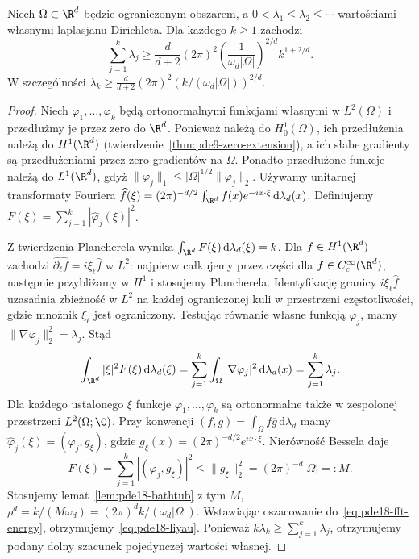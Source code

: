 \begin{twierdzenie}
\label{thm:pde18-liyau}
Niech $\Omega\subset\R^d$ będzie ograniczonym obszarem,
a $0<\lambda_1\le\lambda_2\le\cdots$ wartościami własnymi
laplasjanu Dirichleta. Dla każdego $k\ge1$ zachodzi
\begin{equation}\label{eq:pde18-liyau}
 \sum_{j=1}^k\lambda_j\ge
 \frac{d}{d+2}(2\pi)^2
 \left(\frac{1}{\omega_d|\Omega|}\right)^{2/d}
 k^{1+2/d}.
\end{equation}
W szczególności
$\lambda_k\ge\frac d{d+2}(2\pi)^2
(k/(\omega_d|\Omega|))^{2/d}$.
\end{twierdzenie}
\begin{proof}
Niech $\varphi_1,\ldots,\varphi_k$ będą ortonormalnymi
funkcjami własnymi w $L^2(\Omega)$ i przedłużmy je przez
zero do $\R^d$. Ponieważ należą do $H_0^1(\Omega)$,
ich przedłużenia należą do $H^1(\R^d)$
(twierdzenie~\ref{thm:pde9-zero-extension}), a ich słabe
gradienty są przedłużeniami przez zero gradientów na $\Omega$.
Ponadto przedłużone funkcje należą do $L^1(\R^d)$, gdyż
$\|\varphi_j\|_1\le|\Omega|^{1/2}\|\varphi_j\|_2$.
Używamy unitarnej transformaty Fouriera
$\widehat f(\xi)=(2\pi)^{-d/2}
\int_{\R^d}f(x)e^{-ix\cdot\xi}\,\mathrm d\lambda_d(x)$.
Definiujemy $F(\xi)=\sum_{j=1}^k|\widehat\varphi_j(\xi)|^2$.

Z twierdzenia Plancherela wynika
$\int_{\R^d}F(\xi)\,\mathrm d\lambda_d(\xi)=k$.
Dla $f\in H^1(\R^d)$ zachodzi
$\widehat{\partial_\ell f}=i\xi_\ell\widehat f$
w $L^2$: najpierw całkujemy przez części dla
$f\in C_c^\infty(\R^d)$, następnie przybliżamy w $H^1$
i stosujemy Plancherela. Identyfikację granicy
$i\xi_\ell\widehat f$ uzasadnia zbieżność w $L^2$
na każdej ograniczonej kuli w przestrzeni częstotliwości,
gdzie mnożnik $\xi_\ell$ jest ograniczony.
Testując równanie własne funkcją $\varphi_j$, mamy
$\|\nabla\varphi_j\|_2^2=\lambda_j$.
Stąd
\begin{equation}\label{eq:pde18-fft-energy}
 \int_{\R^d}|\xi|^2F(\xi)\,\mathrm d\lambda_d(\xi)
 =\sum_{j=1}^k\int_\Omega|\nabla\varphi_j|^2
 \,\mathrm d\lambda_d(x)=\sum_{j=1}^k\lambda_j.
\end{equation}
Dla każdego ustalonego $\xi$ funkcje
$\varphi_1,\ldots,\varphi_k$ są ortonormalne także
w zespolonej przestrzeni $L^2(\Omega;\C)$.
Przy konwencji $(f,g)=\int_\Omega f\overline g\,\mathrm d\lambda_d$
mamy $\widehat\varphi_j(\xi)=(\varphi_j,g_\xi)$,
gdzie $g_\xi(x)=(2\pi)^{-d/2}e^{ix\cdot\xi}$.
Nierówność Bessela daje
\[
 F(\xi)=\sum_{j=1}^k|(\varphi_j,g_\xi)|^2
 \le\|g_\xi\|_2^2=(2\pi)^{-d}|\Omega|=:M.
\]
Stosujemy lemat~\ref{lem:pde18-bathtub} z tym $M$,
$\rho^d=k/(M\omega_d)=(2\pi)^dk/(\omega_d|\Omega|)$.
Wstawiając oszacowanie do~\eqref{eq:pde18-fft-energy},
otrzymujemy~\eqref{eq:pde18-liyau}. Ponieważ
$k\lambda_k\ge\sum_{j=1}^k\lambda_j$, otrzymujemy
podany dolny szacunek pojedynczej wartości własnej.
\end{proof}

